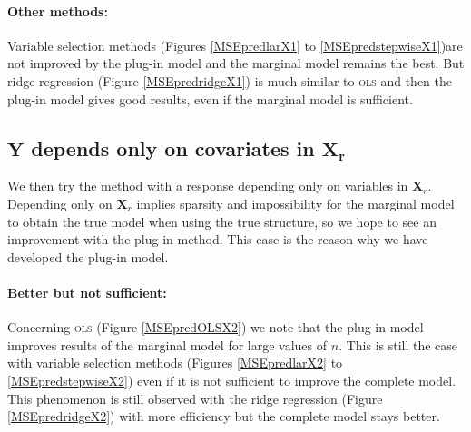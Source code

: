 \documentclass[12pt,a4paper]{report}
\begin{document}
\paragraph{Other methods:} Variable selection methods (Figures \ref{MSEpredlarX1} to \ref{MSEpredstepwiseX1})are not improved by the plug-in model and the marginal model remains the best. But ridge regression (Figure \ref{MSEpredridgeX1}) is much similar to \textsc{ols} and then the plug-in model gives good results, even if the marginal model is sufficient.


	 \subsection{$\boldsymbol{Y}$ depends only on covariates in $\boldsymbol{X_{r}}$ }
 \label{tableMSEsimgauchepred}
We then try the method with a response depending only on variables in $\boldsymbol{X}_r$. 
Depending only on $\boldsymbol{X}_r$ implies sparsity and impossibility for the marginal model to obtain the true model when using the true structure, so we hope to see an improvement with the plug-in method. This case is the reason why we have developed the plug-in model. \\

\paragraph{Better but not sufficient:} Concerning \textsc{ols} (Figure \ref{MSEpredOLSX2}) we note that the plug-in model improves results of the marginal model for large values of $n$. This is still the case with variable selection methods (Figures \ref{MSEpredlarX2} to \ref{MSEpredstepwiseX2}) even if it is not sufficient to improve the complete model. This phenomenon is still observed with the ridge regression (Figure \ref{MSEpredridgeX2}) with more efficiency but the complete model stays better.\\
\end{document}
